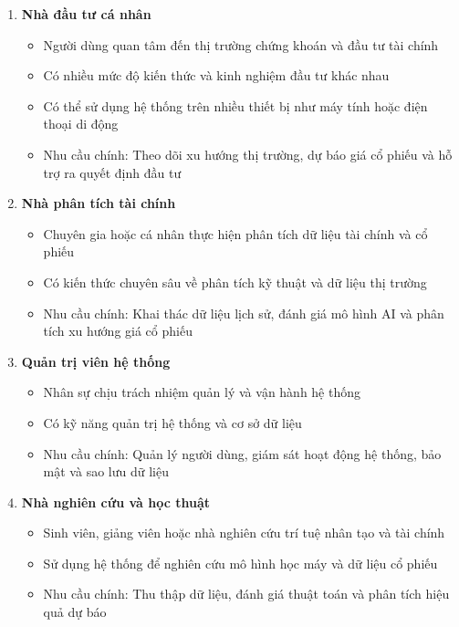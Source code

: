 \documentclass[12pt, a4paper]{article}
\begin{document}
\begin{enumerate}
    \renewcommand{\labelenumi}{\arabic{enumi})}
    \item \textbf{Nhà đầu tư cá nhân}
          \begin{itemize}
              \item Người dùng quan tâm đến thị trường chứng khoán và đầu tư tài chính
              \item Có nhiều mức độ kiến thức và kinh nghiệm đầu tư khác nhau
              \item Có thể sử dụng hệ thống trên nhiều thiết bị như máy tính hoặc điện thoại di động
              \item Nhu cầu chính: Theo dõi xu hướng thị trường, dự báo giá cổ phiếu và hỗ trợ ra quyết định đầu tư
          \end{itemize}

    \item \textbf{Nhà phân tích tài chính}
          \begin{itemize}
              \item Chuyên gia hoặc cá nhân thực hiện phân tích dữ liệu tài chính và cổ phiếu
              \item Có kiến thức chuyên sâu về phân tích kỹ thuật và dữ liệu thị trường
              \item Nhu cầu chính: Khai thác dữ liệu lịch sử, đánh giá mô hình AI và phân tích xu hướng giá cổ phiếu
          \end{itemize}

    \item \textbf{Quản trị viên hệ thống}
          \begin{itemize}
              \item Nhân sự chịu trách nhiệm quản lý và vận hành hệ thống
              \item Có kỹ năng quản trị hệ thống và cơ sở dữ liệu
              \item Nhu cầu chính: Quản lý người dùng, giám sát hoạt động hệ thống, bảo mật và sao lưu dữ liệu
          \end{itemize}

    \item \textbf{Nhà nghiên cứu và học thuật}
          \begin{itemize}
              \item Sinh viên, giảng viên hoặc nhà nghiên cứu trí tuệ nhân tạo và tài chính
              \item Sử dụng hệ thống để nghiên cứu mô hình học máy và dữ liệu cổ phiếu
              \item Nhu cầu chính: Thu thập dữ liệu, đánh giá thuật toán và phân tích hiệu quả dự báo
          \end{itemize}

\end{enumerate}
\end{document}
